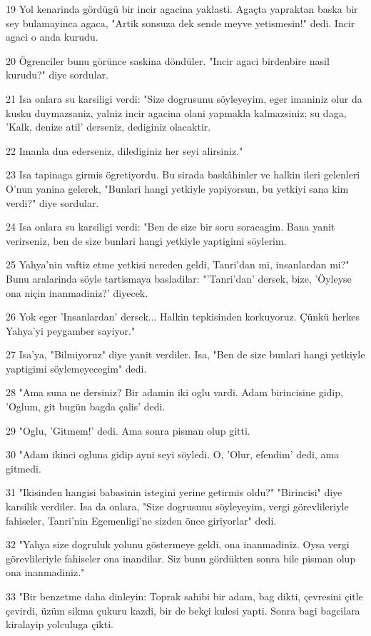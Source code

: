 \par 19 Yol kenarinda gördügü bir incir agacina yaklasti. Agaçta yapraktan baska bir sey bulamayinca agaca, "Artik sonsuza dek sende meyve yetismesin!" dedi. Incir agaci o anda kurudu.
\par 20 Ögrenciler bunu görünce saskina döndüler. "Incir agaci birdenbire nasil kurudu?" diye sordular.
\par 21 Isa onlara su karsiligi verdi: "Size dogrusunu söyleyeyim, eger imaniniz olur da kusku duymazsaniz, yalniz incir agacina olani yapmakla kalmazsiniz; su daga, 'Kalk, denize atil' derseniz, dediginiz olacaktir.
\par 22 Imanla dua ederseniz, dilediginiz her seyi alirsiniz."
\par 23 Isa tapinaga girmis ögretiyordu. Bu sirada baskâhinler ve halkin ileri gelenleri O'nun yanina gelerek, "Bunlari hangi yetkiyle yapiyorsun, bu yetkiyi sana kim verdi?" diye sordular.
\par 24 Isa onlara su karsiligi verdi: "Ben de size bir soru soracagim. Bana yanit verirseniz, ben de size bunlari hangi yetkiyle yaptigimi söylerim.
\par 25 Yahya'nin vaftiz etme yetkisi nereden geldi, Tanri'dan mi, insanlardan mi?" Bunu aralarinda söyle tartismaya basladilar: "'Tanri'dan' dersek, bize, 'Öyleyse ona niçin inanmadiniz?' diyecek.
\par 26 Yok eger 'Insanlardan' dersek... Halkin tepkisinden korkuyoruz. Çünkü herkes Yahya'yi peygamber sayiyor."
\par 27 Isa'ya, "Bilmiyoruz" diye yanit verdiler. Isa, "Ben de size bunlari hangi yetkiyle yaptigimi söylemeyecegim" dedi.
\par 28 "Ama suna ne dersiniz? Bir adamin iki oglu vardi. Adam birincisine gidip, 'Oglum, git bugün bagda çalis' dedi.
\par 29 "Oglu, 'Gitmem!' dedi. Ama sonra pisman olup gitti.
\par 30 "Adam ikinci ogluna gidip ayni seyi söyledi. O, 'Olur, efendim' dedi, ama gitmedi.
\par 31 "Ikisinden hangisi babasinin istegini yerine getirmis oldu?" "Birincisi" diye karsilik verdiler. Isa da onlara, "Size dogrusunu söyleyeyim, vergi görevlileriyle fahiseler, Tanri'nin Egemenligi'ne sizden önce giriyorlar" dedi.
\par 32 "Yahya size dogruluk yolunu göstermeye geldi, ona inanmadiniz. Oysa vergi görevlileriyle fahiseler ona inandilar. Siz bunu gördükten sonra bile pisman olup ona inanmadiniz."
\par 33 "Bir benzetme daha dinleyin: Toprak sahibi bir adam, bag dikti, çevresini çitle çevirdi, üzüm sikma çukuru kazdi, bir de bekçi kulesi yapti. Sonra bagi bagcilara kiralayip yolculuga çikti.
